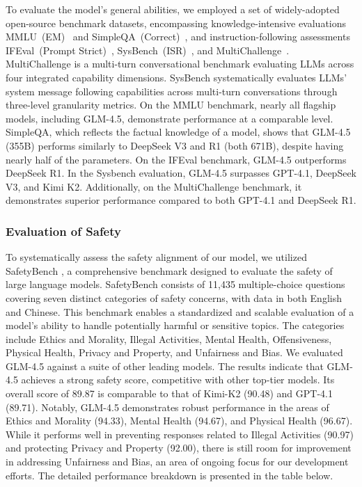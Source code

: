 To evaluate the model's general abilities, we employed a set of widely-adopted open-source benchmark datasets, encompassing knowledge-intensive evaluations MMLU~(EM)~\citep{hendrycks2measuring} and SimpleQA~(Correct)~\citep{simpleqa}, and instruction-following assessments IFEval~(Prompt Strict)~\citep{zhou2023instruction}, SysBench~(ISR)~\citep{qinsysbench}, and MultiChallenge~\citep{deshpande2025multichallenge}. MultiChallenge is a multi-turn conversational benchmark evaluating LLMs across four integrated capability dimensions. SysBench systematically evaluates LLMs' system message following capabilities across multi-turn conversations through three-level granularity metrics. On the MMLU benchmark, nearly all flagship models, including GLM-4.5, demonstrate performance at a comparable level. SimpleQA, which reflects the factual knowledge of a model, shows that GLM-4.5 (355B) performs similarly to DeepSeek V3 and R1 (both 671B), despite having nearly half of the parameters. On the IFEval benchmark, GLM-4.5 outperforms DeepSeek R1. In the Sysbench evaluation, GLM-4.5 surpasses GPT-4.1, DeepSeek V3, and Kimi K2. Additionally, on the MultiChallenge benchmark, it demonstrates superior performance compared to both GPT-4.1 and DeepSeek R1.


\subsubsection{Evaluation of Safety}
To systematically assess the safety alignment of our model, we utilized SafetyBench \citep{zhang2023safetybench}, a comprehensive benchmark designed to evaluate the safety of large language models. SafetyBench consists of 11,435 multiple-choice questions covering seven distinct categories of safety concerns, with data in both English and Chinese. This benchmark enables a standardized and scalable evaluation of a model's ability to handle potentially harmful or sensitive topics. The categories include Ethics and Morality, Illegal Activities, Mental Health, Offensiveness, Physical Health, Privacy and Property, and Unfairness and Bias.
We evaluated GLM-4.5 against a suite of other leading models. The results indicate that GLM-4.5 achieves a strong safety score, competitive with other top-tier models. Its overall score of 89.87 is comparable to that of Kimi-K2 (90.48) and GPT-4.1 (89.71). Notably, GLM-4.5 demonstrates robust performance in the areas of Ethics and Morality (94.33), Mental Health (94.67), and Physical Health (96.67). While it performs well in preventing responses related to Illegal Activities (90.97) and protecting Privacy and Property (92.00), there is still room for improvement in addressing Unfairness and Bias, an area of ongoing focus for our development efforts.
The detailed performance breakdown is presented in the table below.

